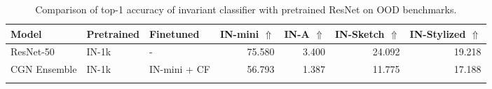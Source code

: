 
\begin{table}[H]
    \centering
    \footnotesize
    \captionsetup{font=footnotesize,skip=1mm}
    \caption{Comparison of top-1 accuracy of invariant classifier with pretrained ResNet on OOD benchmarks.}
    \label{tab:ood}

\begin{tabular}{@{}lllrrrr@{}}
\toprule
\textbf{Model} & \textbf{Pretrained} & \textbf{Finetuned} & \textbf{IN-mini} $\Uparrow$ & \textbf{IN-A} $\Uparrow$ & \textbf{IN-Sketch} $\Uparrow$ & \textbf{IN-Stylized} $\Uparrow$ \\ \midrule
ResNet-50 & IN-1k & - & 75.580 & 3.400 & 24.092 &  19.218               \\
CGN Ensemble & IN-1k & IN-mini + CF & 56.793 & 1.387 & 11.775 &  17.188                \\
\arrayrulecolor{black}\bottomrule
\end{tabular}
\end{table}
